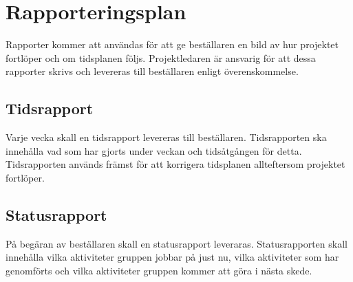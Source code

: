 \section{Rapporteringsplan}
Rapporter kommer att användas för att ge beställaren en bild av hur projektet fortlöper och om tidsplanen följs. Projektledaren är ansvarig för att dessa rapporter skrivs och levereras till beställaren enligt överenskommelse.

\subsection{Tidsrapport}
Varje vecka skall en tidsrapport levereras till beställaren. Tidsrapporten ska innehålla vad som har gjorts under veckan och tidsåtgången för detta. Tidsrapporten används främst för att korrigera tidsplanen allteftersom projektet fortlöper.

\subsection{Statusrapport}
På begäran av beställaren skall en statusrapport leveraras. Statusrapporten skall innehålla vilka aktiviteter gruppen jobbar på just nu, vilka aktiviteter som har genomförts och vilka aktiviteter gruppen kommer att göra i nästa skede.

